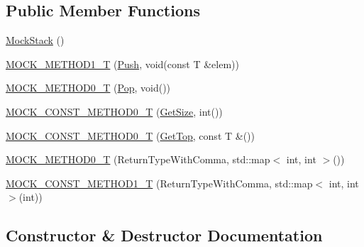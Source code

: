 \subsection*{Public Member Functions}
\begin{DoxyCompactItemize}
\item 
\hyperlink{classtesting_1_1gmock__generated__function__mockers__test_1_1MockStack_aa8a3df8e1cbc95836663acd99c3e9d37}{Mock\+Stack} ()
\item 
\hyperlink{classtesting_1_1gmock__generated__function__mockers__test_1_1MockStack_a0ad833bc6134c5150b8271a5ba2e91b5}{M\+O\+C\+K\+\_\+\+M\+E\+T\+H\+O\+D1\+\_\+T} (\hyperlink{classtesting_1_1gmock__generated__function__mockers__test_1_1StackInterface_a49448f6195021fee947d37b80b6e5d30}{Push}, void(const T \&elem))
\item 
\hyperlink{classtesting_1_1gmock__generated__function__mockers__test_1_1MockStack_a5e55ffb22e7f11c6940a97bd001bd50c}{M\+O\+C\+K\+\_\+\+M\+E\+T\+H\+O\+D0\+\_\+T} (\hyperlink{classtesting_1_1gmock__generated__function__mockers__test_1_1StackInterface_a1a6646d1d9febe90c607b9b3e4539b67}{Pop}, void())
\item 
\hyperlink{classtesting_1_1gmock__generated__function__mockers__test_1_1MockStack_a6171be20e8e4f44464cc8968e05b7c7a}{M\+O\+C\+K\+\_\+\+C\+O\+N\+S\+T\+\_\+\+M\+E\+T\+H\+O\+D0\+\_\+T} (\hyperlink{classtesting_1_1gmock__generated__function__mockers__test_1_1StackInterface_a537ec8647a2333f50e5f923a85b90eba}{Get\+Size}, int())
\item 
\hyperlink{classtesting_1_1gmock__generated__function__mockers__test_1_1MockStack_ae5950cfac08382a0ffc7c3bd5aba405f}{M\+O\+C\+K\+\_\+\+C\+O\+N\+S\+T\+\_\+\+M\+E\+T\+H\+O\+D0\+\_\+T} (\hyperlink{classtesting_1_1gmock__generated__function__mockers__test_1_1StackInterface_af36e32b9ae568100363466d1ebf95364}{Get\+Top}, const T \&())
\item 
\hyperlink{classtesting_1_1gmock__generated__function__mockers__test_1_1MockStack_a4b67d1f5b795e7c072fb846217a8f130}{M\+O\+C\+K\+\_\+\+M\+E\+T\+H\+O\+D0\+\_\+T} (Return\+Type\+With\+Comma, std\+::map$<$ int, int $>$())
\item 
\hyperlink{classtesting_1_1gmock__generated__function__mockers__test_1_1MockStack_a69b9a7d0231b729d8a47201a49fa9166}{M\+O\+C\+K\+\_\+\+C\+O\+N\+S\+T\+\_\+\+M\+E\+T\+H\+O\+D1\+\_\+T} (Return\+Type\+With\+Comma, std\+::map$<$ int, int $>$(int))
\end{DoxyCompactItemize}


\subsection{Constructor \& Destructor Documentation}
